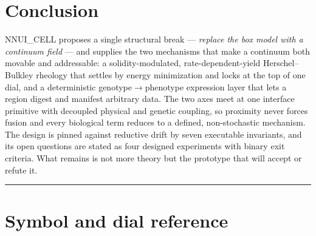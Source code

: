 \documentclass[11pt]{article}
\begin{document}
\section{Conclusion}

NNUI\_CELL proposes a single structural break --- \emph{replace the box model with a continuum
field} --- and supplies the two mechanisms that make a continuum both movable and addressable: a
solidity-modulated, rate-dependent-yield Herschel--Bulkley rheology that settles by energy
minimization and locks at the top of one dial, and a deterministic genotype$\rightarrow$phenotype
expression layer that lets a region digest and manifest arbitrary data. The two axes meet at one
interface primitive with decoupled physical and genetic coupling, so proximity never forces
fusion and every biological term reduces to a defined, non-stochastic mechanism. The design is
pinned against reductive drift by seven executable invariants, and its open questions are stated
as four designed experiments with binary exit criteria. What remains is not more theory but the
prototype that will accept or refute it.

\vspace{1em}
\noindent\textcolor{rule}{\rule{\linewidth}{0.8pt}}
\vspace{0.4em}


\appendix
\section{Symbol and dial reference}
\end{document}
